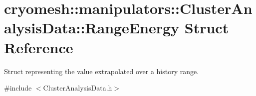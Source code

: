 \hypertarget{structcryomesh_1_1manipulators_1_1ClusterAnalysisData_1_1RangeEnergy}{\section{cryomesh\-:\-:manipulators\-:\-:\-Cluster\-Analysis\-Data\-:\-:\-Range\-Energy \-Struct \-Reference}
\label{structcryomesh_1_1manipulators_1_1ClusterAnalysisData_1_1RangeEnergy}
}


\-Struct representing the value extrapolated over a history range.  




{\ttfamily \#include $<$\-Cluster\-Analysis\-Data.\-h$>$}

